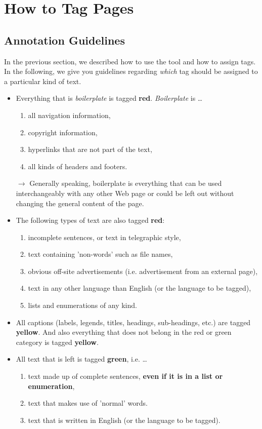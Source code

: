 \documentclass[12pt,a4paper]{article}
\begin{document}
\section{How to Tag Pages}

\subsection{Annotation Guidelines}
\label{Annotation}
In the previous section, we described how to use the tool and how to assign tags. In the following, we give you guidelines regarding \emph{which} tag should be assigned to a particular kind of text.

\begin{itemize}
	\item Everything that is \emph{boilerplate} is tagged \textbf{red}. \emph{Boilerplate} is \ldots
	\begin{enumerate}
		\item all navigation information,
		\item copyright information,
		\item hyperlinks that are not part of the text,
		\item all kinds of headers and footers.
	\end{enumerate}
	$\rightarrow$ Generally speaking, boilerplate is everything that can be used interchangeably with any other Web page or could be left out without changing the general content of the page.
	\item The following types of text are also tagged \textbf{red}:
	\begin{enumerate}
		\item incomplete sentences, or text in telegraphic style,
		\item text containing 'non-words' such as file names,
		\item obvious off-site advertisements (i.e. advertisement from an external page),
		\item text in any other language than English (or the language to be tagged),
		\item lists and enumerations of any kind.
	\end{enumerate}
	\item All captions (labels, legends, titles, headings, sub-headings, etc.) are tagged \textbf{yellow}. And also everything that does not belong in the red or green category is tagged \textbf{yellow}.
	\item All text that is left is tagged \textbf{green}, i.e. \ldots
	\begin{enumerate}
		\item text made up of complete sentences, \textbf{even if it is in a list or enumeration},
		\item text that makes use of 'normal' words.
		\item text that is written in English (or the language to be tagged).
	\end{enumerate}
\end{itemize}
\end{document}
